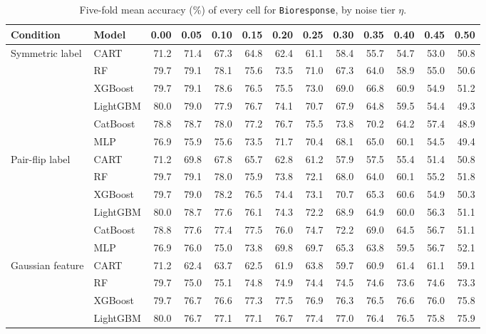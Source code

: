 \begin{table}[p]
\centering
\tiny
\setlength{\tabcolsep}{2.6pt}
\caption{Five-fold mean accuracy (\%) of every cell for \texttt{Bioresponse}, by noise tier $\eta$.}
\label{tab:grid_Bioresponse}
\begin{tabular}{@{}llrrrrrrrrrrr@{}}
\toprule
Condition & Model & 0.00 & 0.05 & 0.10 & 0.15 & 0.20 & 0.25 & 0.30 & 0.35 & 0.40 & 0.45 & 0.50 \\
\midrule
Symmetric label & CART & 71.2 & 71.4 & 67.3 & 64.8 & 62.4 & 61.1 & 58.4 & 55.7 & 54.7 & 53.0 & 50.8 \\
 & RF & 79.7 & 79.1 & 78.1 & 75.6 & 73.5 & 71.0 & 67.3 & 64.0 & 58.9 & 55.0 & 50.6 \\
 & XGBoost & 79.7 & 79.1 & 78.6 & 76.5 & 75.5 & 73.0 & 69.0 & 66.8 & 60.9 & 54.9 & 51.2 \\
 & LightGBM & 80.0 & 79.0 & 77.9 & 76.7 & 74.1 & 70.7 & 67.9 & 64.8 & 59.5 & 54.4 & 49.3 \\
 & CatBoost & 78.8 & 78.7 & 78.0 & 77.2 & 76.7 & 75.5 & 73.8 & 70.2 & 64.2 & 57.4 & 48.9 \\
 & MLP & 76.9 & 75.9 & 75.6 & 73.5 & 71.7 & 70.4 & 68.1 & 65.0 & 60.1 & 54.5 & 49.4 \\
\midrule
Pair-flip label & CART & 71.2 & 69.8 & 67.8 & 65.7 & 62.8 & 61.2 & 57.9 & 57.5 & 55.4 & 51.4 & 50.8 \\
 & RF & 79.7 & 79.1 & 78.0 & 75.9 & 73.8 & 72.1 & 68.0 & 64.0 & 60.1 & 55.2 & 51.8 \\
 & XGBoost & 79.7 & 79.0 & 78.2 & 76.5 & 74.4 & 73.1 & 70.7 & 65.3 & 60.6 & 54.9 & 50.3 \\
 & LightGBM & 80.0 & 78.7 & 77.6 & 76.1 & 74.3 & 72.2 & 68.9 & 64.9 & 60.0 & 56.3 & 51.1 \\
 & CatBoost & 78.8 & 77.6 & 77.4 & 77.5 & 76.0 & 74.7 & 72.2 & 69.0 & 64.5 & 56.7 & 51.1 \\
 & MLP & 76.9 & 76.0 & 75.0 & 73.8 & 69.8 & 69.7 & 65.3 & 63.8 & 59.5 & 56.7 & 52.1 \\
\midrule
Gaussian feature & CART & 71.2 & 62.4 & 63.7 & 62.5 & 61.9 & 63.8 & 59.7 & 60.9 & 61.4 & 61.1 & 59.1 \\
 & RF & 79.7 & 75.0 & 75.1 & 74.8 & 74.9 & 74.4 & 74.5 & 74.6 & 73.6 & 74.6 & 73.3 \\
 & XGBoost & 79.7 & 76.7 & 76.6 & 77.3 & 77.5 & 76.9 & 76.3 & 76.5 & 76.6 & 76.0 & 75.8 \\
 & LightGBM & 80.0 & 76.7 & 77.1 & 77.1 & 76.7 & 77.4 & 77.0 & 76.4 & 76.5 & 75.8 & 75.9 \\

\end{tabular}
\end{table}
